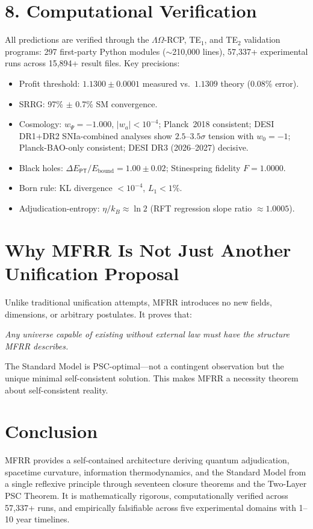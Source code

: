 \documentclass[11pt]{article}
\newcommand{\PT}{\ensuremath{{\mathsf{PT}}}}
\begin{document}
\section*{8. Computational Verification}

All predictions are verified through the $\Lambda\Omega$-RCP, TE$_1$, and TE$_2$ validation
programs: 297 first-party Python modules ($\sim$210,000 lines), 57,337+ experimental runs
across 15,894+ result files. Key precisions:

\begin{itemize}
    \item Profit threshold: $1.1300 \pm 0.0001$ measured vs.\ $1.1309$ theory (0.08\% error).
    \item SRRG: 97\% $\pm$ 0.7\% SM convergence.
    \item Cosmology: $w_\Psi = -1.000$, $|w_a| < 10^{-4}$; Planck~2018 consistent; DESI DR1+DR2 SNIa-combined analyses show $2.5$--$3.5\sigma$ tension with $w_0=-1$; Planck-BAO-only consistent; DESI DR3 (2026--2027) decisive.
    \item Black holes: $\Delta E_\PT / E_\mathrm{bound} = 1.00 \pm 0.02$; Stinespring fidelity $F = 1.0000$.
    \item Born rule: KL divergence $< 10^{-4}$, $L_1 < 1\%$.
    \item Adjudication-entropy: $\eta/k_B \approx \ln 2$ (RFT regression slope ratio $\approx 1.0005$).
\end{itemize}

\section*{Why MFRR Is Not Just Another Unification Proposal}

Unlike traditional unification attempts, MFRR introduces no new fields, dimensions, or arbitrary
postulates. It proves that:
\begin{center}
\emph{Any universe capable of existing without external law must have the structure MFRR describes.}
\end{center}
The Standard Model is PSC-optimal---not a contingent observation but the unique minimal
self-consistent solution. This makes MFRR a necessity theorem about self-consistent reality.

\section*{Conclusion}

MFRR provides a self-contained architecture deriving quantum adjudication, spacetime curvature,
information thermodynamics, and the Standard Model from a single reflexive principle through
seventeen closure theorems and the Two-Layer PSC Theorem. It is mathematically rigorous,
computationally verified across 57,337+ runs, and empirically falsifiable across five experimental
domains with 1--10 year timelines.
\end{document}

